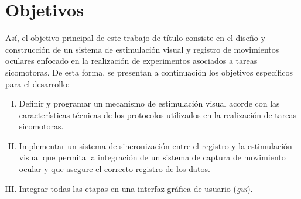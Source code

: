 \documentclass[../main.tex]{subfiles}
\begin{document}
	\section{Objetivos}
	\label{sec:01_objetivos}
		Así, el objetivo principal de este trabajo de título consiste en el diseño y construcción de un sistema de estimulación visual y registro de movimientos oculares enfocado en la realización de experimentos asociados a tareas sicomotoras. De esta forma, se presentan a continuación los objetivos específicos para el desarrollo: 
		
		\begin{enumerate}[(I)]\setlength\itemsep{-0.5em}
			\item Definir y programar un mecanismo de estimulación visual acorde con las características técnicas de los protocolos utilizados en la realización de tareas sicomotoras.
			
			\item Implementar un sistema de sincronización entre el registro y la estimulación visual que permita la integración de un sistema de captura de movimiento ocular y que asegure el correcto registro de los datos.
			
			\item Integrar todas las etapas en una interfaz gráfica de usuario (\textit{\acrshort{gui}}). 	
		
		\end{enumerate}

\end{document}
